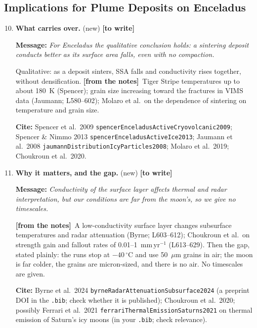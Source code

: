 \documentclass[11pt]{article}
\newcommand{\Miss}{\textcolor{miss}{\textbf{[to write]}}\ }
\newcommand{\Note}{\textcolor{open}{\textbf{[from the notes]}}\ }
\newcommand{\Cite}[1]{\par{\footnotesize\raggedright\textcolor{have}{\textbf{Cite:}} #1\par}}
\newcommand{\Msg}[1]{\par\textcolor{open}{\textbf{Message:}} \textit{#1}\par}
\newcommand{\New}[1]{\textbf{#1} \textnormal{\small(new)}}
\begin{document}
\subsection{Implications for Plume Deposits on Enceladus}
\begin{enumerate}
\setcounter{enumi}{9}
\item \New{What carries over.} \Miss
  \Msg{For Enceladus the qualitative conclusion holds: a sintering deposit conducts better as its surface area falls, even with no compaction.}
  Qualitative: as a deposit sinters, SSA
  falls and conductivity rises together, without densification. \Note Tiger
  Stripe temperatures up to about 180~K (Spencer); grain size increasing
  toward the fractures in VIMS data (Jaumann; L580--602); Molaro et al.\ on
  the dependence of sintering on temperature and grain size.
  \Cite{Spencer et al.\ 2009 \texttt{spencerEnceladusActiveCryovolcanic2009}; Spencer \& Nimmo 2013 \texttt{spencerEnceladusActiveIce2013}; Jaumann et al.\ 2008 \texttt{jaumannDistribution\allowbreak IcyParticles2008}; Molaro et al.\ 2019; Choukroun et al.\ 2020.}
\item \New{Why it matters, and the gap.} \Miss
  \Msg{Conductivity of the surface layer affects thermal and radar interpretation, but our conditions are far from the moon's, so we give no timescales.}
  \Note A low-conductivity
  surface layer changes subsurface temperatures and radar attenuation
  (Byrne; L603--612); Choukroun et al.\ on strength gain and fallout rates
  of 0.01--1~mm\,yr$^{-1}$ (L613--629). Then the gap, stated plainly: the
  runs stop at $-40\,^{\circ}$C and use 50~$\mu$m grains in air; the moon is
  far colder, the grains are micron-sized, and there is no air. No
  timescales are given.
  \Cite{Byrne et al.\ 2024 \texttt{byrneRadarAttenuationSubsurface2024} (a preprint DOI in the \texttt{.bib}; check whether it is published); Choukroun et al.\ 2020; possibly Ferrari et al.\ 2021 \texttt{ferrariThermalEmissionSaturns2021} on thermal emission of Saturn's icy moons (in your \texttt{.bib}; check relevance).}
\end{enumerate}
\end{document}
